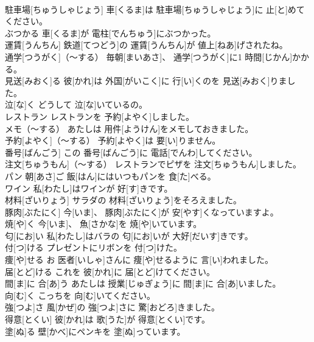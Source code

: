 \documentclass[8pt]{extreport}
\begin{document}
\begin{CJK}{UTF8}{min}
\\	駐車場[ちゅうしゃじょう]	車[くるま]は 駐車場[ちゅうしゃじょう]に 止[と]めてください。		
\\	ぶつかる	車[くるま]が 電柱[でんちゅう]にぶつかった。		
\\	運賃[うんちん]	鉄道[てつどう]の 運賃[うんちん]が 値上[ねあ]げされたね。		
\\	通学[つうがく]（～する）	毎朝[まいあさ]、 通学[つうがく]に1 時間[じかん]かかる。		
\\	見送[みおく]る	彼[かれ]は 外国[がいこく]に 行[い]くのを 見送[みおく]りました。		
\\	泣[な]く	どうして 泣[な]いているの。		
\\	レストラン	レストランを 予約[よやく]しました。		
\\	メモ（～する）	あたしは 用件[ようけん]をメモしておきました。		
\\	予約[よやく]（～する）	予約[よやく]は 要[い]りません。		
\\	番号[ばんごう]	この 番号[ばんごう]に 電話[でんわ]してください。		
\\	注文[ちゅうもん]（～する）	レストランでピザを 注文[ちゅうもん]しました。		
\\	パン	朝[あさ]ご 飯[はん]にはいつもパンを 食[た]べる。		
\\	ワイン	私[わたし]はワインが 好[す]きです。		
\\	材料[ざいりょう]	サラダの 材料[ざいりょう]をそろえました。		
\\	豚肉[ぶたにく]	今[いま]、 豚肉[ぶたにく]が 安[やす]くなっていますよ。		
\\	焼[や]く	今[いま]、 魚[さかな]を 焼[や]いています。		
\\	匂[にお]い	私[わたし]はバラの 匂[にお]いが 大好[だいす]きです。		
\\	付[つ]ける	プレゼントにリボンを 付[つ]けた。		
\\	痩[や]せる	お 医者[いしゃ]さんに 痩[や]せるように 言[い]われました。		
\\	届[とど]ける	これを 彼[かれ]に 届[とど]けてください。		
\\	間[ま]に 合[あ]う	あたしは 授業[じゅぎょう]に 間[ま]に 合[あ]いました。		
\\	向[む]く	こっちを 向[む]いてください。		
\\	強[つよ]さ	風[かぜ]の 強[つよ]さに 驚[おどろ]きました。		
\\	得意[とくい]	彼[かれ]は 歌[うた]が 得意[とくい]です。		
\\	塗[ぬ]る	壁[かべ]にペンキを 塗[ぬ]っています。		

\end{CJK}
\end{document}
